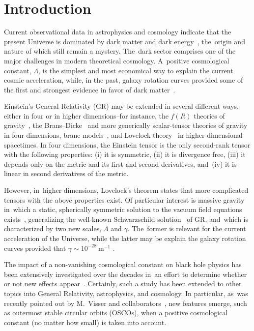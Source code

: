 \documentclass[aps,amsmath,amssymb,twocolumn]{revtex4}
\begin{document}
\maketitle


\section{Introduction\label{sec1}}

Current observational data in astrophysics and cosmology indicate that the present Universe is dominated by dark matter and dark energy~\cite{turner}, the~origin and nature of which still remain a mystery. The~dark sector comprises one of the major challenges in modern theoretical cosmology. A~positive cosmological constant, $\Lambda$, \cite{carroll} is the simplest and most economical way to explain the current cosmic acceleration, while, in the past, galaxy rotation curves  provided some of the first and strongest evidence in favor of dark matter~\cite{rubin}. 

Einstein's General Relativity (GR) \cite{einstein} may be extended in several different ways, either in four or in higher dimensions--for instance, the $f(R)$ theories of gravity~\cite{mod1,mod2}, the Brans--Dicke~\cite{Brans:1961sx,Brans:1962zz,Dicke:1961gz} and more generically scalar-tensor theories of gravity in four dimensions, brane models~\cite{brane1,brane2}, and Lovelock theory~\cite{Lovelock:1971yv} in higher dimensional spacetimes. 
%
In four dimensions, the Einstein tensor is the only second-rank tensor with the following properties: (i) it is symmetric, (ii) it is divergence free, (iii) it depends only on the metric
and its first and second derivatives, and~(iv) it is linear in second derivatives of the metric. 

However, in~higher dimensions, Lovelock's theorem
states that more complicated tensors with the above
properties exist.
%
Of particular interest is massive gravity~\cite{deRham:2010ik,deRham:2010kj} in~which a static, spherically symmetric solution to the vacuum field equations exists~\cite{Ghosh:2015cva}, generalizing the well-known Schwarzschild solution~\cite{SBH} of GR, and~which is characterized by two new scales, $\Lambda$ and $\gamma$. The~former is relevant for the current acceleration of the Universe, while the latter may be explain the galaxy rotation curves provided that $\gamma \sim 10^{-28}~\text{m}^{-1}$ \cite{Panpanich:2018cxo}. 


The impact of a non-vanishing cosmological constant on black hole physics has been extensively investigated over the decades in~an effort to determine
whether or not new effects appear~\cite{Ashtekar:2017dlf}. Certainly, such a study has been extended to other topics into General Relativity, astrophysics, and cosmology.
%
In particular, as~was recently pointed out by M.~Visser and collaborators~\cite{Boonserm:2019nqq},  new features emerge, such as outermost stable circular orbits (OSCOs), when a positive cosmological constant (no matter how small) is taken into account.
%
\end{document}

